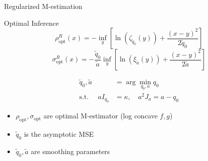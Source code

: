 \documentclass[pdf]{beamer}
\begin{document}
\begin{frame}{Regularized M-estimation}

\begin{block}{Optimal Inference}
\begin{equation*}
 \rho_{\text{opt}}^R(x) =  -\inf_y{\left[ \ln(\zeta_{\tilde{q}_0}(y)) + \frac{(x-y)^2}{2 \tilde{q}_0}\right]}
\end{equation*}
\begin{equation*}
\sigma_{\text{opt}}^{R}(x)=-\frac{\tilde{q}_0}{\tilde{a}}\inf_y{\left[ \ln(\xi_{\tilde{a}}(y)) +\frac{(x-y)^2}{2 \tilde{a}}\right]} \label{optReg}
\end{equation*}



\begin{equation*}
\begin{split}
\tilde{q}_0,\tilde{a} &= \arg\min_{q_0,a}{q_0} \\
\text{s.t. }\quad  a I_{q_0} & = \kappa,\quad a^2 J_a = a-q_0
\label{unregopt}
\end{split}
\end{equation*}


\begin{itemize}
\item $\rho_{\text{opt}},\sigma_{\text{opt}}$ are optimal M-estimator (log concave $f,g$)

\item $\tilde{q}_0$ is the asymptotic MSE
\item $\tilde{q}_0,\tilde{a}$ are smoothing parameters
\end{itemize}
\end{block}
\end{frame}
\end{document}
